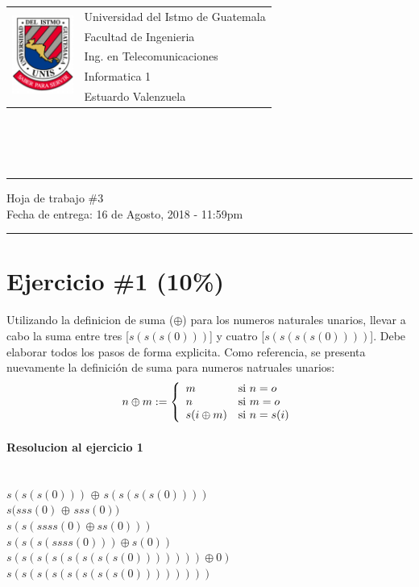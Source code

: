 \documentclass{article}
\newcommand{\horrule}[1]{\rule{\linewidth}{#1}}
\begin{document}
\begin{tabular}{l l}
	\multirow{5}{*}{\includegraphics[width=2cm]{data/logo.png}}
 & Universidad del Istmo de Guatemala \\
 & Facultad de Ingenieria \\
 & Ing. en Telecomunicaciones \\
 & Informatica 1 \\
 & Estuardo Valenzuela
\end{tabular}
\\\\\\
\begin{center}
	\horrule{0.5pt}
	\huge{Hoja de trabajo \#3} \\
	\large{Fecha de entrega: 16 de Agosto, 2018 - 11:59pm} \\
	\horrule{1pt}
\end{center}
\section*{Ejercicio \#1 (10\%)}
Utilizando la definicion de suma ($\oplus$) para los numeros naturales unarios, llevar
a cabo la suma entre tres [$s(s(s(0)))$] y cuatro [$s(s(s(s(0))))$]. Debe elaborar todos
los pasos de forma explicita. Como referencia, se presenta nuevamente la definici\'on de
suma para numeros natruales unarios:
\[
n\oplus m := \left\{
\begin{array}{l l}
m & \mbox{si } n=o \\
n & \mbox{si } m=o \\
s(i\oplus m) & \mbox{si } n=s(i) \\
\end{array}
\right.
\]
\paragraph{Resolucion al ejercicio 1} 
\begin{center}
\ \\  $s(s(s(0)))$ $\oplus$ $s(s(s(s(0))))$
\ \\  $s(sss(0)$ $\oplus$ $sss(0)) $
\ \\  $s(s(ssss(0) \oplus ss(0)))$
\ \\  $s(s(s(ssss(0))) \oplus s(0))$
\ \\ $s(s(s(s(s(s(s(s(0))))))) \oplus 0)$
\ \\ $s(s(s(s(s(s(s(s(0))))))))$
\end{center}
\end{document}
